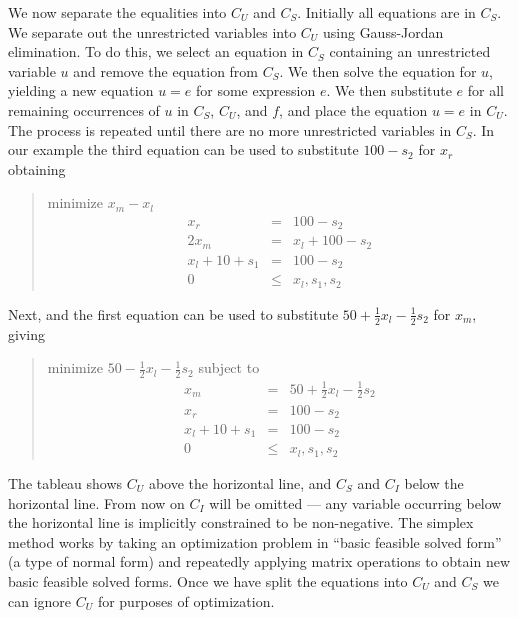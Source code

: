 \documentclass{article}
\begin{document}
We now separate the equalities into $C_U$ and $C_S$\@.
Initially all equations are in $C_S$\@.  We separate out the
unrestricted variables into $C_U$ using Gauss-Jordan elimination.  To do
this, we select an equation in $C_S$ containing an unrestricted variable
$u$ and remove the equation
from $C_S$\@.  We then solve the equation for $u$, yielding
a new equation $u=e$ for some expression $e$.  We then substitute $e$ for
all remaining occurrences of $u$ in $C_S$, $C_U$, and $f$,
and place the equation $u=e$ in
$C_U$\@.  The process is repeated until there are no more unrestricted
variables in $C_S$\@.  In our example the third equation can be used to
substitute $100 - s_2$ for $x_r$ 
obtaining
\begin{quote}\vspace*{-1ex}
minimize $x_m - x_l$ 
$$
\begin{array}{rcl}
x_r &= & 100 - s_2 \\ \hline
2 x_m & = & x_l + 100 - s_2 \\
x_l + 10 + s_1& = & 100 - s_2 \\
0 &\leq & x_l, s_1, s_2
\end{array}
$$
\end{quote}\vspace{-0.9ex}
Next, 
and the first equation can be used to 
substitute $50 + \frac{1}{2}x_l - \frac{1}{2} s_2$ 
for $x_m$, giving 
\begin{quote}\vspace*{-1ex}
minimize $50 - \frac{1}{2}x_l - \frac{1}{2} s_2$ 
subject to 
$$
\begin{array}{rcl}
x_m & = & 50 + \frac{1}{2} x_l - \frac{1}{2} s_2 \\ 
x_r &= & 100 - s_2 \\ \hline
x_l + 10 + s_1& = &100 - s_2 \\
0 &\leq & x_l, s_1, s_2
\end{array}
$$
\end{quote}\vspace{-0.9ex}
The tableau shows $C_U$ above the horizontal line,
and $C_S$ and $C_I$ below the horizontal line.  From now 
on $C_I$ will be omitted --- any variable occurring below the horizontal
line is implicitly constrained to be non-negative.
The simplex method works by taking an optimization problem in ``basic
feasible solved form'' (a type of normal form) and repeatedly applying
matrix operations to obtain new basic feasible solved forms.  Once we
have split the equations into $C_U$ and $C_S$ we can ignore $C_U$ for
purposes of optimization. 
\end{document}
